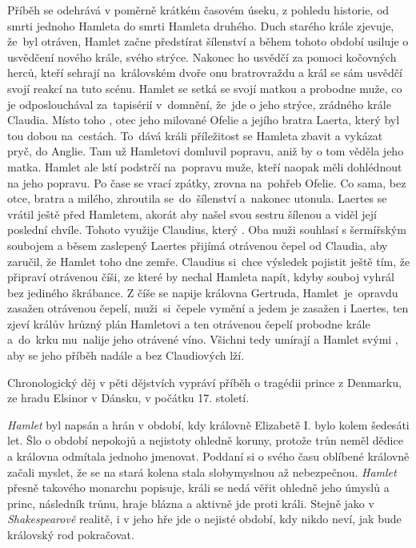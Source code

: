 \documentclass[../main.tex]{subfiles}
\begin{document}
\noindent 
Příběh se odehrává v poměrně krátkém časovém úseku, z pohledu historie,
od smrti jednoho Hamleta do smrti Hamleta druhého.
Duch starého krále zjevuje, že~byl otráven, Hamlet začne předstírat šílenství
a během tohoto období usiluje o usvědčení nového krále, svého strýce.
Nakonec ho usvědčí za pomoci kočovných herců, kteří sehrají na~královském dvoře onu bratrovraždu
a král se sám usvědčí svojí reakcí na tuto scénu.
Hamlet se setká se svojí matkou a probodne muže, co je odposlouchával za~tapisérií v~domnění,
že~jde o jeho strýce, zrádného krále Claudia.
Místo toho , otec jeho milované Ofelie a jejího bratra Laerta,
který byl tou dobou na~cestách.
To~dává králi příležitost se Hamleta zbavit a vykázat pryč, do Anglie.
Tam už Hamletovi domluvil popravu, aniž by o tom věděla jeho matka.
Hamlet ale lstí podstrčí na~popravu muže, kteří naopak měli dohlédnout na jeho popravu.
Po čase se vrací zpátky, zrovna na~pohřeb Ofelie.
Co sama, bez otce, bratra a milého, zhroutila se~do~šílenství a~nakonec utonula.
Laertes se vrátil ještě před Hamletem, akorát aby našel svou sestru šílenou a viděl její poslední chvíle.
Tohoto využije Claudius, který .
Oba muži souhlasí s šermířským soubojem a běsem zaslepený Laertes přijímá otrávenou čepel od Claudia,
aby zaručil, že Hamlet toho dne zemře.
Claudius si~chce výsledek pojistit ještě tím, že připraví otrávenou číši,
ze které by nechal Hamleta napít, kdyby souboj vyhrál bez jediného škrábance.
Z číše se napije královna Gertruda, Hamlet~je~opravdu zasažen otrávenou čepelí,
muži~si~čepele vymění a jedem je zasažen i Laertes, ten zjeví králův hrůzný plán Hamletovi
a ten otrávenou čepelí probodne krále a~do~krku mu~nalije jeho otrávené víno.
Všichni tedy umírají a Hamlet svými ,
aby se jeho příběh nadále  a bez Claudiových lží.

\noindent 
Chronologický děj v pěti dějstvích vypráví příběh o tragédii prince z Denmarku, ze hradu Elsinor v Dánsku, v počátku 17. století.



\noindent
\textit{Hamlet} byl napsán a hrán v období, kdy královně Elizabetě I. bylo kolem šedesáti let.
Šlo o období nepokojů a nejistoty ohledně koruny, protože trůn neměl dědice a královna odmítala jednoho jmenovat.
Poddaní si o svého času oblíbené královně začali myslet, že se na stará kolena stala slobymyslnou až nebezpečnou.
\textit{Hamlet} přesně takového monarchu popisuje, králi se nedá věřit ohledně jeho úmyslů a princ, následník trůnu, hraje blázna a aktivně jde proti králi.
Stejně jako v \textit{Shakespearově} realitě, i v jeho hře jde o nejisté období, kdy nikdo neví, jak bude královský rod pokračovat.
\end{document}
